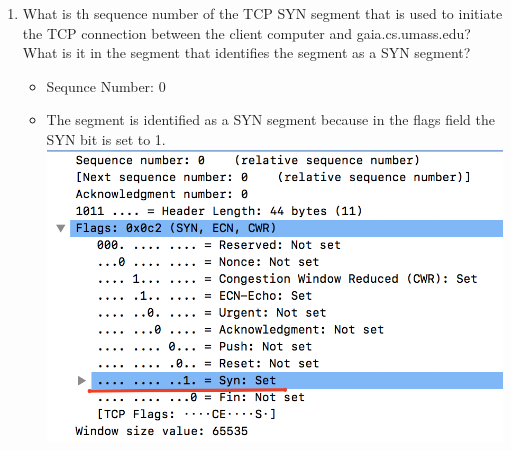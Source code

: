 \documentclass{article}
\begin{document}
\begin{enumerate}
    \item What is th sequence number of the TCP SYN segment that is used to initiate the TCP connection between the client computer and gaia.cs.umass.edu?
    What is it in the segment that identifies the segment as a SYN segment?
        \begin{itemize}
          \item Sequnce Number: 0
          \item The segment is identified as a SYN segment because in the flags field the SYN bit is set to 1.
          \includegraphics[scale=0.5]{images/TCP4.png}
        \end{itemize}


\end{enumerate}
\end{document}
